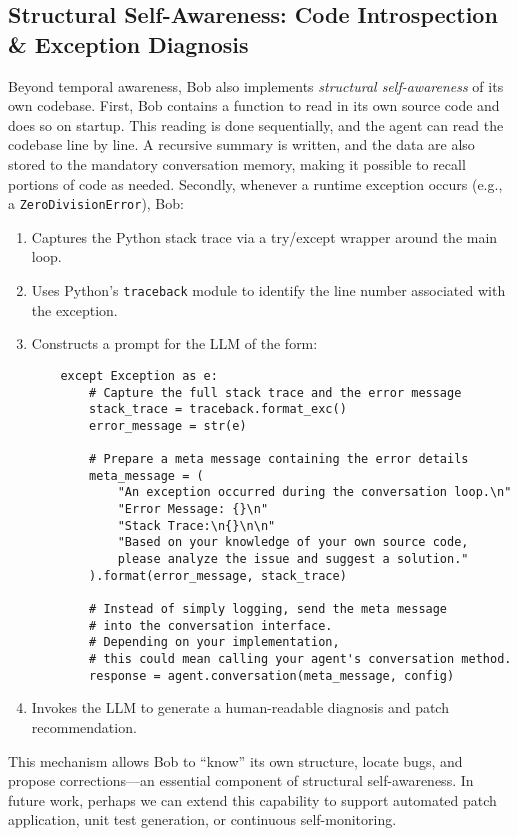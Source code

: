 \documentclass[11pt]{article}
\begin{document}
\subsection{Structural Self-Awareness: Code Introspection \& Exception Diagnosis}
Beyond temporal awareness, Bob also implements \emph{structural self-awareness} of its own codebase. 
First, Bob contains a function to read in its own source code and does so on startup.
This reading is done sequentially, and the agent can read the codebase line by line.  
A recursive summary is written, and the data are also stored to the mandatory conversation memory,
making it possible to recall portions of code as needed.  
Secondly, whenever a runtime exception occurs (e.g., a \texttt{ZeroDivisionError}), Bob:
\begin{enumerate}[leftmargin=*]
  \item Captures the Python stack trace via a try/except wrapper around the main loop.
  \item Uses Python’s \texttt{traceback} module to identify the line number associated with the exception.
  \item Constructs a prompt for the LLM of the form:
  \begin{verbatim} 
    except Exception as e:
        # Capture the full stack trace and the error message
        stack_trace = traceback.format_exc()
        error_message = str(e)
    
        # Prepare a meta message containing the error details
        meta_message = (
            "An exception occurred during the conversation loop.\n"
            "Error Message: {}\n"
            "Stack Trace:\n{}\n\n"
            "Based on your knowledge of your own source code, 
            please analyze the issue and suggest a solution."
        ).format(error_message, stack_trace)
    
        # Instead of simply logging, send the meta message 
        # into the conversation interface.
        # Depending on your implementation, 
        # this could mean calling your agent's conversation method.
        response = agent.conversation(meta_message, config)
\end{verbatim}
\item Invokes the LLM to generate a human-readable diagnosis and patch recommendation.
\end{enumerate}

This mechanism allows Bob to “know” its own structure, locate bugs, and propose corrections—an essential component of structural self-awareness. In future work, perhaps we can extend this capability to support automated patch application, unit test generation, or continuous self-monitoring.
\end{document}
